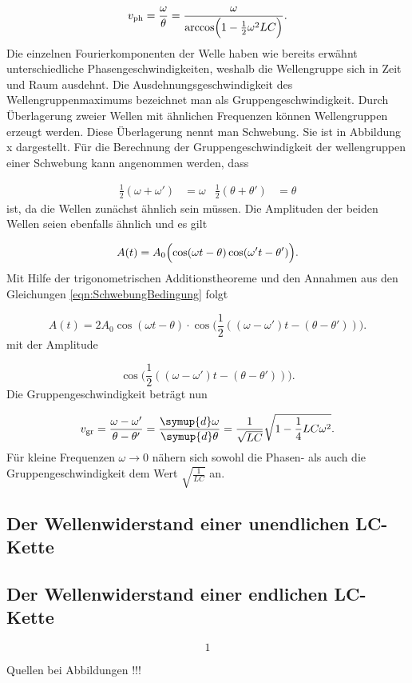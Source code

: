 \begin{equation}
  v_\text{ph} = \frac{\omega}{\theta} = \frac{\omega}{\arccos \Bigl(
  1-\frac{1}{2}\omega^2LC\Bigr)}.
\end{equation}
Die einzelnen Fourierkomponenten der Welle haben wie bereits erwähnt
unterschiedliche Phasengeschwindigkeiten, weshalb die Wellengruppe sich in Zeit
und Raum ausdehnt. Die Ausdehnungsgeschwindigkeit des Wellengruppenmaximums
bezeichnet man als Gruppengeschwindigkeit.
Durch Überlagerung zweier Wellen mit ähnlichen Frequenzen können Wellengruppen
erzeugt werden. Diese Überlagerung nennt man Schwebung. Sie ist in Abbildung x
dargestellt.
Für die Berechnung der Gruppengeschwindigkeit der wellengruppen einer Schwebung
kann angenommen werden, dass

\begin{align}
\frac{1}{2}(\omega + \omega') & = \omega & \frac{1}{2}(\theta + \theta') &
= \theta
\label{eqn:SchwebungBedingung}
\end{align}
ist, da die Wellen zunächst ähnlich sein müssen.
Die Amplituden der beiden Wellen seien ebenfalls ähnlich und es gilt

\begin{equation}
  A(t) = A_0 \Bigl(\cos(\omega t - \theta) \cos(\omega' t - \theta')\Bigr).
\end{equation}
Mit Hilfe der trigonometrischen Additionstheoreme und den Annahmen aus den
Gleichungen \eqref{eqn:SchwebungBedingung} folgt

\begin{equation}
  A(t) = 2 A_0 \cos(\omega t - \theta) \cdot \cos \Bigr(\frac{1}{2}
  ((\omega-\omega')t-(\theta-\theta'))\Bigr).
\end{equation}
mit der Amplitude

\begin{equation}
  \cos \Bigr(\frac{1}{2}
  ((\omega-\omega')t-(\theta-\theta'))\Bigr).
\end{equation}
Die Gruppengeschwindigkeit beträgt nun

\begin{equation}
  v_\text{gr} = \frac{\omega - \omega'}{\theta - \theta'} =
  \frac{\symup{d}\omega}{\symup{d}\theta} =
  \frac{1}{\sqrt{LC}}\sqrt{1 - \frac{1}{4}LC\omega^2}.
\end{equation}
Für kleine Frequenzen $\omega \to 0$ nähern sich sowohl die Phasen- als auch
die Gruppengeschwindigkeit dem Wert $\sqrt{\frac{1}{LC}}$ an.


\subsection{Der Wellenwiderstand einer unendlichen LC-Kette}


\subsection{Der Wellenwiderstand einer endlichen LC-Kette}

\begin{equation}
1
\end{equation}

Quellen bei Abbildungen !!!


\cite{sample}
